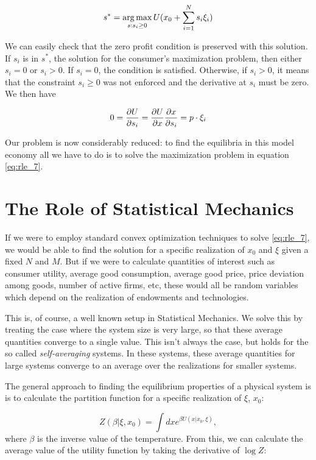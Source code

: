 \begin{equation}
  \label{eq:rle_7}
  s^\ast = \operatorname*{arg\,max}_{s : s_i \geq 0} U(x_0 + \sum_{i=1}^N s_i \xi_i)
\end{equation}

We can easily check that the zero profit condition is preserved with
this solution. If $s_i$ is in $s^\ast$, the solution for the
consumer's maximization problem, then either $s_i = 0$ or $s_i >
0$. If $s_i = 0$, the condition is satisfied. Otherwise, if $s_i > 0$,
it means that the constraint $s_i \geq 0$ was not enforced and the
derivative at $s_i$ must be zero. We then have

\begin{equation}
  \label{eq:rle_9}
  0 = \frac{\partial U}{\partial s_i} = \frac{\partial U}{\partial x} \frac{\partial
    x}{\partial s_i} = p\cdot \xi_i
\end{equation}

Our problem is now considerably reduced: to find the equilibria in
this model economy all we have to do is to solve the maximization problem
in equation \eqref{eq:rle_7}.


\section{The Role of Statistical Mechanics} \label{sec:rle_statmech}

If we were to employ standard convex optimization techniques
to solve \eqref{eq:rle_7}, we would be able to find the solution for a
specific realization of $x_0$ and $\xi$ given a fixed $N$ and $M$. But
if we were to calculate quantities of interest such as consumer
utility, average good consumption, average good price, price deviation
among goods, number of active firms, etc, these would all be random
variables which depend on the realization of endowments and
technologies.

This is, of course, a well known setup in Statistical Mechanics. We
solve this by treating the case where the system size is very large,
so that these average quantities converge to a single value. This
isn't always the case, but holds for the so called
\emph{self-averaging} systems. In these systems, these average
quantities for large systems converge to an average over the
realizations for smaller systems.

The general approach to finding the equilibrium properties of a
physical system is is to calculate the partition function for a specific
realization of $\xi$, $x_0$:

\begin{equation}
  \label{eq:rle_10}
  Z(\beta | \xi, x_0) = \int dx e^{\beta U(x| x_0, \xi)},
\end{equation}
where $\beta$ is the inverse value of the temperature. From this, we
can calculate the average value of the utility function by taking the
derivative of $\log Z$:

